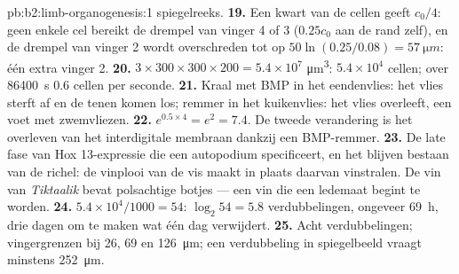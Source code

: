\begin{solution}{pb:b2:limb-organogenesis:1}
spiegelreeks.
\textbf{19.} Een kwart van de cellen geeft $c_0/4$: geen enkele cel bereikt
de drempel van vinger 4 of 3 ($0.25 c_0$ aan de rand zelf), en de drempel
van vinger 2 wordt overschreden tot op $50\ln(0.25/0.08) =
\qty{57}{\micro m}$: één extra vinger 2.
\textbf{20.} $3\times 300\times 300\times 200 = 5.4\times 10^{7}$
\unit{\micro m^3}: $5.4\times 10^{4}$ cellen; over \qty{86400}{s}
$0.6$ cellen per seconde.
\textbf{21.} Kraal met BMP in het eendenvlies: het vlies sterft af en de
tenen komen los; remmer in het kuikenvlies: het vlies overleeft, een voet
met zwemvliezen.
\textbf{22.} $e^{0.5\times 4} = e^{2} = 7.4$. De tweede verandering is het
overleven van het interdigitale membraan dankzij een BMP-remmer.
\textbf{23.} De late fase van Hox 13-expressie die een autopodium specificeert,
en het blijven bestaan van de richel: de vinplooi van de vis maakt in plaats
daarvan vinstralen. De vin van \emph{Tiktaalik} bevat polsachtige botjes ---
een vin die een ledemaat begint te worden.
\textbf{24.} $5.4\times 10^{4}/1000 = 54$: $\log_2 54 = 5.8$ verdubbelingen,
ongeveer \qty{69}{h}, drie dagen om te maken wat één dag verwijdert.
\textbf{25.} Acht verdubbelingen; vingergrenzen bij 26, 69 en
\qty{126}{\micro m}; een verdubbeling in spiegelbeeld vraagt minstens
\qty{252}{\micro m}.
\end{solution}
